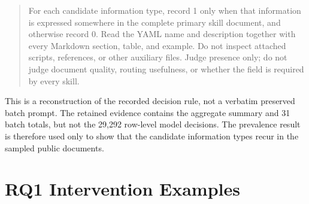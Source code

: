 \begin{quote}
For each candidate information type, record 1 only when that information is expressed somewhere in the complete primary skill document, and otherwise record 0. Read the YAML name and description together with every Markdown section, table, and example. Do not inspect attached scripts, references, or other auxiliary files. Judge presence only; do not judge document quality, routing usefulness, or whether the field is required by every skill.
\end{quote}

This is a reconstruction of the recorded decision rule, not a verbatim preserved batch prompt. The retained evidence contains the aggregate summary and 31 batch totals, but not the 29,292 row-level model decisions. The prevalence result is therefore used only to show that the candidate information types recur in the sampled public documents.

\section{RQ1 Intervention Examples}
\label{app:rq1-intervention-examples}


